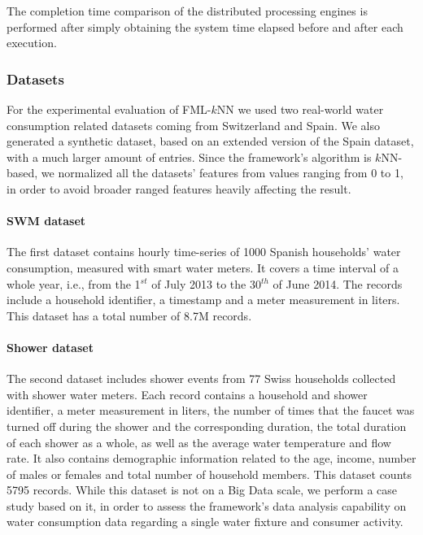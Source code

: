 The completion time comparison of the distributed processing engines is performed after simply obtaining the system time elapsed before and after each execution.

\subsubsection{Datasets}
\label{subsec:datasets}
For the experimental evaluation of FML-$k$NN we used two real-world water consumption related datasets coming from Switzerland and Spain. We also generated a synthetic dataset, based on an extended version of the Spain dataset, with a much larger amount of entries. Since the framework's algorithm is $k$NN-based, we normalized all the datasets' features from values ranging from 0 to 1, in order to avoid broader ranged features heavily affecting the result. 

\paragraph{SWM dataset}
\label{par:alicante}
The first dataset contains hourly time-series of 1000 Spanish households' water consumption, measured with smart water meters. It covers a time interval of a whole year, i.e., from the 1$^{st}$ of July 2013 to the 30$^{th}$ of June 2014. The records include a household identifier, a timestamp and a meter measurement in liters. This dataset has a total number of 8.7M records.

\paragraph{Shower dataset}
\label{par:amphiro}
The second dataset includes shower events from 77 Swiss households collected with shower water meters. Each record contains a household and shower identifier, a meter measurement in liters, the number of times that the faucet was turned off during the shower and the corresponding duration, the total duration of each shower as a whole, as well as the average water temperature and flow rate. It also contains demographic information related to the age, income, number of males or females and total number of household members. This dataset counts 5795 records. While this dataset is not on a Big Data scale, we perform a case study based on it, in order to assess the framework's data analysis capability on water consumption data regarding a single water fixture and consumer activity.

